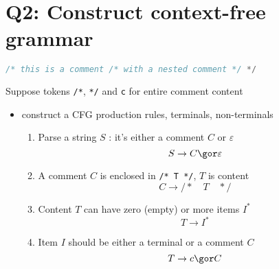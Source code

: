 \section*{Q2: Construct context-free grammar}
\begin{lstlisting}[language=c]
  /* this is a comment /* with a nested comment */ */
\end{lstlisting}
Suppose tokens \texttt{/*}, \texttt{*/} and \texttt{c} for entire comment content
\begin{itemize}
\item construct a CFG production rules, terminals, non-terminals
  \begin{enumerate}
  \item Parse a string $S$ : it's either a comment $C$ or $\varepsilon$
    \begin{equation}
      S\to C \gor \varepsilon
    \end{equation}
  \item A comment $C$ is enclosed in \texttt{/* T */}, $T$ is content
    \begin{equation}
      C\to /*\quad T\quad */
    \end{equation}
  \item Content $T$ can have zero (empty) or more items $I^*$
    \begin{equation}
      T\to I^*
    \end{equation}
  \item Item $I$ should be either a terminal or a comment $C$
    \begin{equation}
      T\to c \gor C
    \end{equation}
  \end{enumerate}

\end{itemize}
